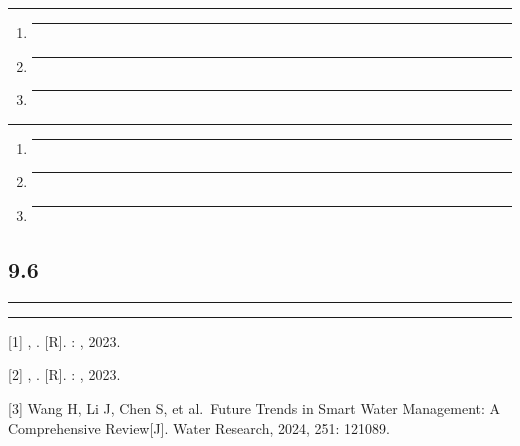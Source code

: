 \begin{center}\rule{0.5\linewidth}{0.5pt}\end{center}

\begin{enumerate}
\def\labelenumi{\arabic{enumi}.}
\item
  \begin{center}\rule{0.5\linewidth}{0.5pt}\end{center}
\item
  \begin{center}\rule{0.5\linewidth}{0.5pt}\end{center}
\item
  \begin{center}\rule{0.5\linewidth}{0.5pt}\end{center}
\end{enumerate}

\begin{center}\rule{0.5\linewidth}{0.5pt}\end{center}

\begin{enumerate}
\def\labelenumi{\arabic{enumi}.}
\item
  \begin{center}\rule{0.5\linewidth}{0.5pt}\end{center}
\item
  \begin{center}\rule{0.5\linewidth}{0.5pt}\end{center}
\item
  \begin{center}\rule{0.5\linewidth}{0.5pt}\end{center}
\end{enumerate}

\subsection{9.6}\label{section-21}

\begin{center}\rule{0.5\linewidth}{0.5pt}\end{center}

\begin{center}\rule{0.5\linewidth}{0.5pt}\end{center}

{[}1{]} , . {[}R{]}. : , 2023.

{[}2{]} , . {[}R{]}. : , 2023.

{[}3{]} Wang H, Li J, Chen S, et al.~Future Trends in Smart Water
Management: A Comprehensive Review{[}J{]}. Water Research, 2024, 251:
121089.

